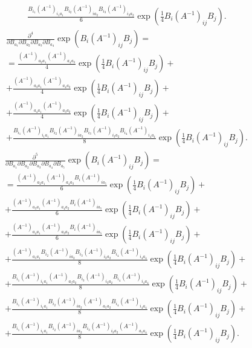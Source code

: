 \documentclass[a4paper]{article}
\begin{document}
\begin{itemize}
\begin{multline*}
\frac{B_{i_1}\left( A^{-1} \right) _{i_1a_1}B_{i_2}\left( A^{-1} \right) _{ia_2}B_{i_3}\left( A^{-1} \right) _{i_3a_2}}{6} \exp \left( \frac{1}{4}B_i \left( A^{-1}\right)_{ij}B_j\right)
.\end{multline*}
\begin{multline*}
	\frac{\partial^4}{\partial B_{a_1}\partial B_{a_2}\partial B_{a_3}\partial B_{a_4}}\exp\left( B_i\left(A^{-1}\right)_{ij} B_j \right)  =\\=
	\frac{\left( A^{-1} \right) _{a_2a_1}(A^{-1})_{a_4a_3}}{4} \exp \left( \frac{1}{4}B_i \left( A^{-1}\right)_{ij}B_j\right)+\\+
\frac{\left( A^{-1} \right) _{a_3a_1}\left( A^{-1} \right) _{a_4a_2}}{4} \exp \left( \frac{1}{4}B_i \left( A^{-1}\right)_{ij}B_j\right)+\\+
\frac{\left( A^{-1} \right) _{a_4a_1}\left( A^{-1} \right) _{a_3a_2}}{4} \exp \left( \frac{1}{4}B_i \left( A^{-1}\right)_{ij}B_j\right)+\\+
\frac{B_{i_1}\left( A^{-1} \right) _{i_1a_1}B_{i_2}\left( A^{-1} \right) _{ia_2}B_{i_3}\left( A^{-1} \right) _{i_3a_2}B_{i_4}\left( A^{-1} \right) _{i_4a_4}}{8} \exp \left( \frac{1}{4}B_i \left( A^{-1}\right)_{ij}B_j\right)
.\end{multline*}
\begin{multline*}
	\frac{\partial^5}{\partial B_{a_1}\partial B_{a_2}\partial B_{a_3}\partial B_{a_4}\partial B_{a_5}}\exp\left( B_i\left(A^{-1}\right)_{ij} B_j \right)  =\\=
	\frac{\left( A^{-1} \right) _{a_2a_1}(A^{-1})_{a_4a_3}
	B_i (A^{-1})_{ia_5}}{6} \exp \left( \frac{1}{4}B_i \left( A^{-1}\right)_{ij}B_j\right)+\\+
\frac{\left( A^{-1} \right) _{a_3a_1}\left( A^{-1} \right) _{a_4a_2}B_i (A^{-1})_{ia_5}}{6} \exp \left( \frac{1}{4}B_i \left( A^{-1}\right)_{ij}B_j\right)+\\+
\frac{\left( A^{-1} \right) _{a_4a_1}\left( A^{-1} \right) _{a_3a_2}B_i (A^{-1})_{ia_5}}{6} \exp \left( \frac{1}{4}B_i \left( A^{-1}\right)_{ij}B_j\right)+\\+
\frac{\left( A^{-1} \right) _{a_5a_1}B_{i_2}\left( A^{-1} \right) _{ia_2}B_{i_3}\left( A^{-1} \right) _{i_3a_2}B_{i_4}\left( A^{-1} \right) _{i_4a_4}}{8} \exp \left( \frac{1}{4}B_i \left( A^{-1}\right)_{ij}B_j\right)+\\+
\frac{B_{i_1}\left( A^{-1} \right) _{i_1a_1}\left( A^{-1} \right) _{a_5a_2}B_{i_3}\left( A^{-1} \right) _{i_3a_2}B_{i_4}\left( A^{-1} \right) _{i_4a_4}}{8} \exp \left( \frac{1}{4}B_i \left( A^{-1}\right)_{ij}B_j\right)+\\+
\frac{B_{i_1}\left( A^{-1} \right) _{i_1a_1}B_{i_2}\left( A^{-1} \right) _{ia_2}\left( A^{-1} \right) _{a_5a_2}B_{i_4}\left( A^{-1} \right) _{i_4a_4}}{8} \exp \left( \frac{1}{4}B_i \left( A^{-1}\right)_{ij}B_j\right)+\\+
\frac{B_{i_1}\left( A^{-1} \right) _{i_1a_1}B_{i_2}\left( A^{-1} \right) _{ia_2}B_{i_3}\left( A^{-1} \right) _{i_3a_2}\left( A^{-1} \right) _{a_5a_4}}{8} \exp \left( \frac{1}{4}B_i \left( A^{-1}\right)_{ij}B_j\right)
.\end{multline*}
\end{itemize}
\end{document}
